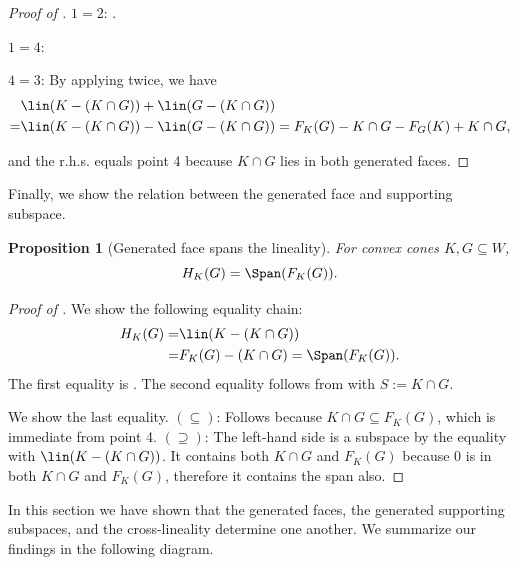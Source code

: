 \documentclass{article}
\theoremstyle{plain}
\newtheorem{proposition}[proposition]{Proposition}
\theoremstyle{definition}
\theoremstyle{remark}
\begin{document}
\begin{proof}[\hypertarget{loc:cross_lineality.proof}{}Proof of ]

$1 = 2$: .

$1 = 4$: 

$4 = 3$: 
By applying  twice, we have
\begin{align*}
&\lin(K - (K \cap G)) + \lin(G - (K \cap G))\\
=&\lin(K - (K \cap G)) - \lin(G - (K \cap G))
= F_K(G) - K \cap G - F_G(K) + K \cap G,
\end{align*}

and the r.h.s. equals point 4 because $K \cap G$ lies in both generated faces.
\end{proof}
Finally, we show the relation between the generated face and supporting subspace.
\begin{proposition}[Generated face spans the lineality]
\label{loc:generated_face_spans_the_lineality.statement}
For convex cones $K, G \subseteq W$,
\begin{equation*}
H_K(G) = \Span(F_K(G)).
\end{equation*}
\end{proposition}
\begin{proof}[\hypertarget{loc:generated_face_spans_the_lineality.proof}{}Proof of ]

We show the following equality chain:
\begin{align*}
H_K(G) = &\lin(K - (K \cap G))\\
=&F_K(G) - (K\cap G) 
= \Span(F_K(G)).
\end{align*}
The first equality is .
The second equality follows from  with $S := K \cap G$.

We show the last equality.
$(\subseteq)$: Follows because $K\cap G \subseteq F_K(G)$, which is immediate from  point 4.
$(\supseteq)$: The left-hand side is a subspace by the equality with $\lin(K-(K\cap G))$. It contains both $K\cap G$ and $F_K(G)$ because $0$ is in both $K\cap G$ and $F_K(G)$, therefore it contains the span also.
\end{proof}
In this section we have shown that the generated faces, the generated supporting subspaces, and the cross-lineality determine one another. We summarize our findings in the following diagram.
\end{document}
